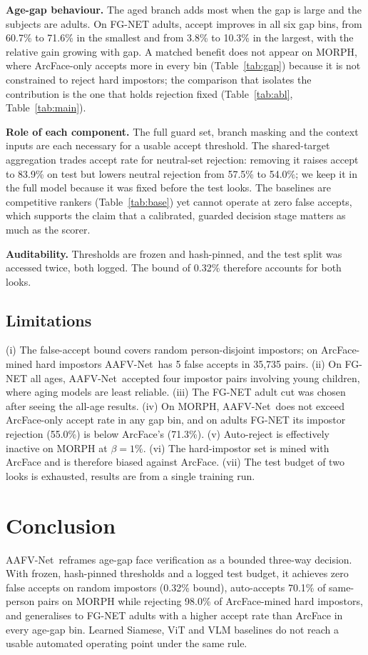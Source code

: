 \documentclass[10pt, a4paper, twocolumn]{article}
\newcommand{\sys}{AAFV-Net}
\begin{document}
\textbf{Age-gap behaviour.} The aged branch adds most when the gap is large and the subjects are adults. On FG-NET adults, accept improves in all six gap bins, from 60.7\% to 71.6\% in the smallest and from 3.8\% to 10.3\% in the largest, with the relative gain growing with gap. A matched benefit does not appear on MORPH, where ArcFace-only accepts more in every bin (Table~\ref{tab:gap}) because it is not constrained to reject hard impostors; the comparison that isolates the contribution is the one that holds rejection fixed (Table~\ref{tab:abl}, Table~\ref{tab:main}).

\textbf{Role of each component.} The full guard set, branch masking and the context inputs are each necessary for a usable accept threshold. The shared-target aggregation trades accept rate for neutral-set rejection: removing it raises accept to 83.9\% on test but lowers neutral rejection from 57.5\% to 54.0\%; we keep it in the full model because it was fixed before the test looks. The baselines are competitive rankers (Table~\ref{tab:base}) yet cannot operate at zero false accepts, which supports the claim that a calibrated, guarded decision stage matters as much as the scorer.

\textbf{Auditability.} Thresholds are frozen and hash-pinned, and the test split was accessed twice, both logged. The bound of 0.32\% therefore accounts for both looks.

\subsection{Limitations}
(i) The false-accept bound covers random person-disjoint impostors; on ArcFace-mined hard impostors \sys\ has 5 false accepts in 35{,}735 pairs. (ii) On FG-NET all ages, \sys\ accepted four impostor pairs involving young children, where aging models are least reliable. (iii) The FG-NET adult cut was chosen after seeing the all-age results. (iv) On MORPH, \sys\ does not exceed ArcFace-only accept rate in any gap bin, and on adults FG-NET its impostor rejection (55.0\%) is below ArcFace's (71.3\%). (v) Auto-reject is effectively inactive on MORPH at $\beta=1\%$. (vi) The hard-impostor set is mined with ArcFace and is therefore biased against ArcFace. (vii) The test budget of two looks is exhausted, results are from a single training run.

\section{Conclusion}
\sys\ reframes age-gap face verification as a bounded three-way decision. With frozen, hash-pinned thresholds and a logged test budget, it achieves zero false accepts on random impostors (0.32\% bound), auto-accepts 70.1\% of same-person pairs on MORPH while rejecting 98.0\% of ArcFace-mined hard impostors, and generalises to FG-NET adults with a higher accept rate than ArcFace in every age-gap bin. Learned Siamese, ViT and VLM baselines do not reach a usable automated operating point under the same rule. 
\end{document}
